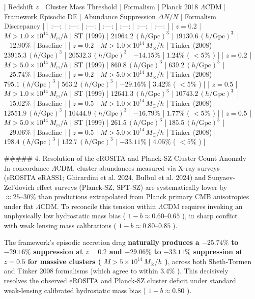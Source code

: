 \documentclass[11pt,a4paper]{article}
\theoremstyle{definition}
\theoremstyle{remark}
\begin{document}
| Redshift $z$ | Cluster Mass Threshold | Formalism | Planck 2018 $\Lambda\text{CDM}$ | Framework Episodic DE | Abundance Suppression $\Delta N / N$ | Formalism Discrepancy |
| :---: | :---: | :---: | :---: | :---: | :---: | :---: |
| $z = 0.2$ | $M > 1.0 \times 10^{14} \, M_\odot/h$ | ST (1999) | $21964.2 \, (h/\text{Gpc})^3$ | $19130.6 \, (h/\text{Gpc})^3$ | \textbf{$-12.90\%$} | Baseline |
| $z = 0.2$ | $M > 1.0 \times 10^{14} \, M_\odot/h$ | Tinker (2008) | $23915.3 \, (h/\text{Gpc})^3$ | $20532.3 \, (h/\text{Gpc})^3$ | \textbf{$-14.15\%$} | $1.24\%$ ( $< 5\%$ ) |
| $z = 0.2$ | $M > 5.0 \times 10^{14} \, M_\odot/h$ | ST (1999) | $860.8 \, (h/\text{Gpc})^3$ | $639.2 \, (h/\text{Gpc})^3$ | \textbf{$-25.74\%$} | Baseline |
| $z = 0.2$ | $M > 5.0 \times 10^{14} \, M_\odot/h$ | Tinker (2008) | $795.1 \, (h/\text{Gpc})^3$ | $563.2 \, (h/\text{Gpc})^3$ | \textbf{$-29.16\%$} | $3.42\%$ ( $< 5\%$ ) |
| $z = 0.5$ | $M > 1.0 \times 10^{14} \, M_\odot/h$ | ST (1999) | $12641.3 \, (h/\text{Gpc})^3$ | $10743.2 \, (h/\text{Gpc})^3$ | \textbf{$-15.02\%$} | Baseline |
| $z = 0.5$ | $M > 1.0 \times 10^{14} \, M_\odot/h$ | Tinker (2008) | $12551.9 \, (h/\text{Gpc})^3$ | $10444.9 \, (h/\text{Gpc})^3$ | \textbf{$-16.79\%$} | $1.77\%$ ( $< 5\%$ ) |
| $z = 0.5$ | $M > 5.0 \times 10^{14} \, M_\odot/h$ | ST (1999) | $261.5 \, (h/\text{Gpc})^3$ | $185.5 \, (h/\text{Gpc})^3$ | \textbf{$-29.06\%$} | Baseline |
| $z = 0.5$ | $M > 5.0 \times 10^{14} \, M_\odot/h$ | Tinker (2008) | $198.4 \, (h/\text{Gpc})^3$ | $132.7 \, (h/\text{Gpc})^3$ | \textbf{$-33.11\%$} | $4.05\%$ ( $< 5\%$ ) |

\#\#\#\#\# 4. Resolution of the eROSITA and Planck-SZ Cluster Count Anomaly
In concordance $\Lambda\text{CDM}$, cluster abundances measured via X-ray surveys (eROSITA eRASS1; Ghirardini et al. 2024, Bulbul et al. 2024) and Sunyaev-Zel'dovich effect surveys (Planck-SZ, SPT-SZ) are systematically lower by $\approx 25\text{--}30\%$ than predictions extrapolated from Planck primary CMB anisotropies under flat $\Lambda\text{CDM}$. To reconcile this tension within $\Lambda\text{CDM}$ requires invoking an unphysically low hydrostatic mass bias ( $1-b \approx 0.60\text{--}0.65$ ), in sharp conflict with weak lensing mass calibrations ( $1-b \approx 0.80\text{--}0.85$ ).

The framework's episodic accretion drag \textbf{naturally produces a $-25.74\%$ to $-29.16\%$ suppression at $z=0.2$ and $-29.06\%$ to $-33.11\%$ suppression at $z=0.5$ for massive clusters ( $M > 5 \times 10^{14} \, M_\odot/h$ )}, across both Sheth-Tormen and Tinker 2008 formalisms (which agree to within $3.4\%$ ). This decisively resolves the observed eROSITA and Planck-SZ cluster deficit under standard weak-lensing calibrated hydrostatic mass bias ( $1-b \approx 0.80$ ).
\end{document}
